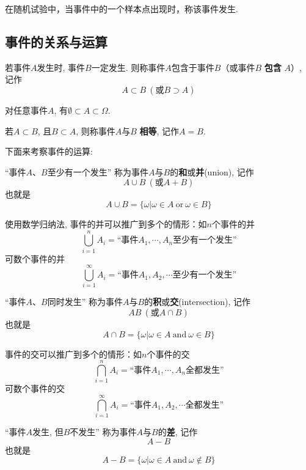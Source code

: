 在随机试验中，当事件中的一个样本点出现时，称该事件发生.

\subsection{事件的关系与运算}

\begin{definition}[事件的关系]
    若事件$A$发生时, 事件$B$一定发生. 则称事件$A$包含于事件$B$（或事件$B$ \textbf{包含} $A$）, 记作
    $$A\subset B \ (\text{或}B\supset A)$$

    对任意事件$A$, 有$\emptyset \subset A\subset \Omega$.

    若$A\subset B$, 且$B\subset A$, 则称事件$A$与$B$ \textbf{相等}, 记作$A=B$.

\end{definition}

下面来考察事件的运算:

\begin{definition}[事件的并]

    “事件$A$、$B$至少有一个发生”
    称为事件$A$与$B$的\textbf{和}或\textbf{并}(union), 记作
    $$A\cup B \ (\text{或}A+B)$$
    也就是
    $$A\cup B=\{\omega | \omega\in A \ \text{or}\ \omega\in B\}$$
\end{definition}

\begin{remark}
    使用数学归纳法, 事件的并可以推广到多个的情形：如$n$个事件的并
    $$\bigcup_{i=1}^{n} A_i =\text{“事件$A_1, \cdots, A_n$至少有一个发生”}$$
    可数个事件的并
    $$\bigcup_{i=1}^{\infty} A_i =\text{“事件$A_1, A_2, \cdots$至少有一个发生”}$$
\end{remark}

\begin{definition}
    “事件$A$、$B$同时发生”
    称为事件$A$与$B$的\textbf{积}或\textbf{交}(intersection), 记作
    $$AB \ (\text{或}A\cap B)$$
    也就是$$A\cap B=\{\omega | \omega\in A \ \text{and}\ \omega\in B\}$$
\end{definition}

\begin{remark}
    事件的交可以推广到多个的情形：如$n$个事件的交
    $$\bigcap_{i=1}^{n} A_i =\text{“事件$A_1, \cdots, A_n$全都发生”}$$
    可数个事件的交
    $$\bigcap_{i=1}^{\infty} A_i =\text{“事件$A_1, A_2, \cdots$全都发生”}$$
\end{remark}

\begin{definition}
    “事件$A$发生, 但$B$不发生”
    称为事件$A$与$B$的\textbf{差}, 记作
    $$A-B$$
    也就是
    $$A- B=\{\omega | \omega\in A \ \text{and}\ \omega\notin B\}$$
\end{definition}

